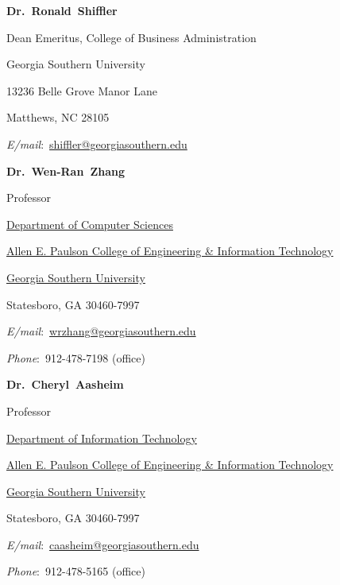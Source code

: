\documentclass[10pt]{article}
\newcommand{\halfblankline}{\quad\vspace{-0.5\baselineskip}\pagebreak[3]}
\begin{document}
{\textbf{Dr.~Ronald~Shiffler}}
%
\begin{innerlist}
   \item[] Dean Emeritus, College of Business Administration
    \item[] Georgia Southern University
    \item[] 13236 Belle Grove Manor Lane
    \item[] Matthews, NC  28105
    \item[] \textit{E\-/mail}:~\href{mailto:shiffler@georgiasouthern.edu}{shiffler@georgiasouthern.edu}
\end{innerlist}

\halfblankline

{\textbf{Dr.~Wen-Ran~Zhang}}
%
\begin{innerlist}
    \item[] Professor
    \item[] \href{http://ceit.georgiasouthern.edu/cs/}{Department of Computer Sciences}
    \item[] \href{http://ceit.georgiasouthern.edu}{Allen E. Paulson College of Engineering \& Information Technology}
    \item[] \href{http://www.georgiasouthern.edu/}{Georgia Southern University}
    \item[] Statesboro, GA 30460-7997
    \item[]  \textit{E\-/mail}:~\href{mailto:wrzhang@georgiasouthern.edu}{wrzhang@georgiasouthern.edu}
    \item[] \textit{Phone}:~912-478-7198 (office)

\end{innerlist}

\halfblankline

{\textbf{Dr.~Cheryl~Aasheim}}
%
\begin{innerlist}
    \item[] Professor
    \item[] \href{http://ceit.georgiasouthern.edu/it/}{Department of Information Technology}
    \item[] \href{http://ceit.georgiasouthern.edu}{Allen E. Paulson College of Engineering \& Information Technology}
    \item[] \href{http://www.georgiasouthern.edu/}{Georgia Southern University}
    \item[] Statesboro, GA 30460-7997
    \item[]  \textit{E\-/mail}:~\href{mailto:caasheim@georgiasouthern.edu}{caasheim@georgiasouthern.edu}
    \item[] \textit{Phone}:~912-478-5165 (office)
\end{innerlist}
\end{document}
